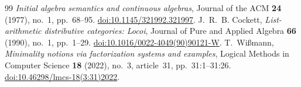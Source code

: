 \documentclass[11pt]{article}
\theoremstyle{definition}\newtheorem{definition}[theorem]{Definition}
\begin{document}
\begin{thebibliography}{99}
\emph{Initial algebra semantics and continuous algebras},
Journal of the ACM \textbf{24} (1977), no.~1, pp.~68--95.
\href{https://doi.org/10.1145/321992.321997}{doi:10.1145/321992.321997}.
J.~R.~B. Cockett, \emph{List-arithmetic distributive categories: Locoi},
Journal of Pure and Applied Algebra \textbf{66} (1990), no.~1, pp.~1--29.
\href{https://doi.org/10.1016/0022-4049(90)90121-W}{doi:10.1016/0022-4049(90)90121-W}.
T.~Wi\ss{}mann, \emph{Minimality notions via factorization systems and examples},
Logical Methods in Computer Science \textbf{18} (2022),
no.~3, article~31, pp.~31:1--31:26.
\href{https://doi.org/10.46298/lmcs-18(3:31)2022}{doi:10.46298/lmcs-18(3:31)2022}.
\end{thebibliography}
\end{document}
